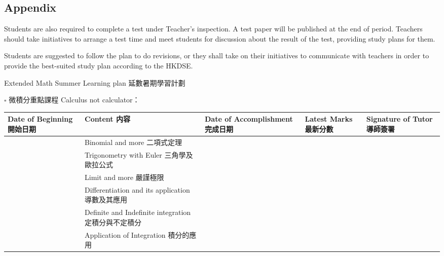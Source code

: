 \documentclass{article}
\begin{document}
    \subsection*{Appendix}

    Students are also required to complete a test under Teacher's inspection. A test paper will be published at the end of period. Teachers should take initiatives to arrange a test time and meet students for discussion about the result of the test, providing study plans for them.

    Students are suggested to follow the plan to do revisions, or they shall take on their initiatives to communicate with teachers in order to provide the best-suited study plan according to the HKDSE.

    \pagebreak
    
    \begin{center}
        Extended Math Summer Learning plan 延數暑期學習計劃
    \end{center}

    $\square$ 微積分重點課程 Calculus not calculator：
    \begin{center}
        \begin{tabular}{|m{3cm}|m{5cm}|m{4cm}|m{2cm}|m{2cm}|}
            \hline
            Date of Beginning 開始日期&Content 内容&Date of Accomplishment 完成日期&Latest Marks 最新分數&Signature of Tutor 導師簽署\\
            \hline
            &Binomial and more 二項式定理&&&\\
            \hline
            &Trigonometry with Euler 三角學及歐拉公式&&&\\
            \hline
            &Limit and more 嚴謹極限&&&\\
            \hline
            &Differentiation and its application 導數及其應用&&&\\
            \hline
            &Definite and Indefinite integration 定積分與不定積分&&&\\
            \hline
            &Application of Integration 積分的應用&&&\\
            \hline
        \end{tabular}
    \end{center}
\end{document}
